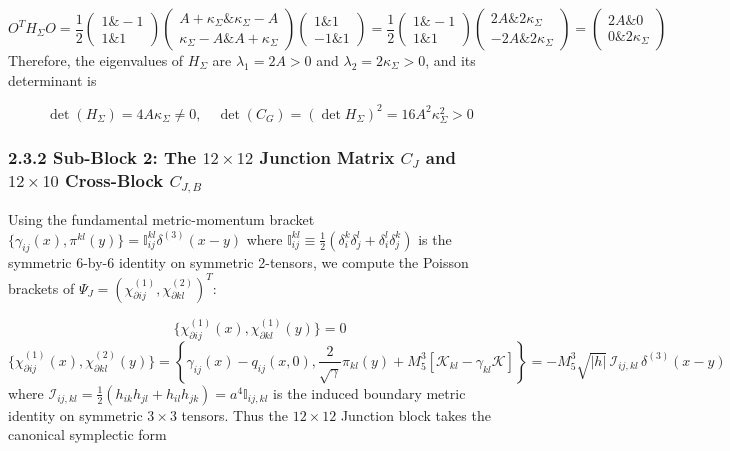 \documentclass[aps,prd,onecolumn,superscriptaddress,nofootinbib,longbibliography,10pt]{revtex4-2}
\begin{document}
  \[ O^T H_\Sigma O = \frac{1}{2}\begin{pmatrix} 1 \& -1 \\ 1 \& 1 \end{pmatrix}\begin{pmatrix} A + \kappa_\Sigma \& \kappa_\Sigma - A \\ \kappa_\Sigma - A \& A + \kappa_\Sigma \end{pmatrix}\begin{pmatrix} 1 \& 1 \\ -1 \& 1 \end{pmatrix} = \frac{1}{2}\begin{pmatrix} 1 \& -1 \\ 1 \& 1 \end{pmatrix}\begin{pmatrix} 2A \& 2\kappa_\Sigma \\ -2A \& 2\kappa_\Sigma \end{pmatrix} = \begin{pmatrix} 2A \& 0 \\ 0 \& 2\kappa_\Sigma \end{pmatrix} \]
  Therefore, the eigenvalues of \(H_\Sigma\) are \(\lambda_1 = 2A > 0\) and \(\lambda_2 = 2\kappa_\Sigma > 0\), and its determinant is


  \[ \det(H_\Sigma) = 4A\kappa_\Sigma \neq 0, \quad \det(C_G) = (\det H_\Sigma)^2 = 16A^2\kappa_\Sigma^2 > 0 \]

  
\subsubsection*{2.3.2 Sub-Block 2: The \(12 \times 12\) Junction Matrix \(C_J\) and \(12 \times 10\) Cross-Block \(C_{J,B}\)}

  Using the fundamental metric-momentum bracket \(\{\gamma_{ij}(x), \pi^{kl}(y)\} = \mathbb{I}_{ij}^{kl}\delta^{(3)}(x-y)\) where \(\mathbb{I}_{ij}^{kl} \equiv \frac{1}{2}(\delta_i^k\delta_j^l + \delta_i^l\delta_j^k)\) is the symmetric 6-by-6 identity on symmetric 2-tensors, we compute the Poisson brackets of \(\Psi_J = (\chi_{\partial ij}^{(1)}, \chi_{\partial kl}^{(2)})^T\):


  \[ \{\chi_{\partial ij}^{(1)}(x), \chi_{\partial kl}^{(1)}(y)\} = 0 \]
  \[ \{\chi_{\partial ij}^{(1)}(x), \chi_{\partial kl}^{(2)}(y)\} = \left\{ \gamma_{ij}(x) - q_{ij}(x,0), \frac{2}{\sqrt{\gamma}}\pi_{kl}(y) + M_5^3[\mathcal{K}_{kl} - \gamma_{kl}\mathcal{K}] \right\} = -M_5^3\sqrt{|h|}\,\mathcal{I}_{ij,kl}\,\delta^{(3)}(x-y) \]
  where \(\mathcal{I}_{ij,kl} = \frac{1}{2}(h_{ik}h_{jl} + h_{il}h_{jk}) = a^4\mathbb{I}_{ij,kl}\) is the induced boundary metric identity on symmetric \(3 \times 3\) tensors. Thus the \(12 \times 12\) Junction block takes the canonical symplectic form
\end{document}
